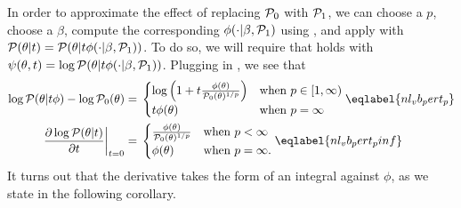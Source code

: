 In order to approximate the effect of replacing $\mathcal{P}_{0}$ with $\mathcal{P}_{1}$, we can
choose a $p$, choose a $\beta$, compute the corresponding $\phi(\cdot \vert
\beta, \mathcal{P}_{1})$ using , and apply  with
$\mathcal{P}(\theta \vert t) = \mathcal{P}(\theta \vert t \phi(\cdot \vert \beta, \mathcal{P}_{1}))$.
To do so, we will require that  holds with
$\psi(\theta, t) = \log \mathcal{P}(\theta \vert t \phi(\cdot \vert \beta, \mathcal{P}_{1}))$.
Plugging in , we see that
%
%
\begin{align}
%
\logp(\theta \vert \t \phi) - \log \pbase(\theta) ={}&
\begin{cases}
    \log\left(1 + \t \frac{\phi(\theta)}{\pbase(\theta)^{1/p}}\right)
    & \textrm{when }p \in [1, \infty) \\
    \t \phi(\theta)
    & \textrm{when }p = \infty
%
\end{cases}  \eqlabel{nl_vb_pert_p}\\
%
\fracat{\partial \log \p(\theta \vert \t)}{\partial \t}{\t=0} ={}&
\begin{cases}
   \frac{\phi(\theta)}{\pbase(\theta)^{1/p}}
   & \textrm{when }p < \infty \\
   \phi(\theta)
   & \textrm{when }p = \infty.
\end{cases}\eqlabel{nl_vb_pert_pinf}
%
\end{align}
%
It turns out that the derivative takes the form of an integral against
$\phi$, as we state in the following corollary.


